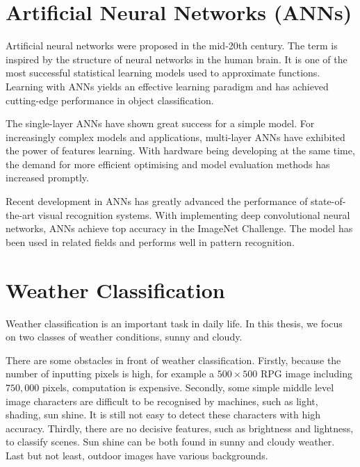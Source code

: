 \section{Artificial Neural Networks (ANNs)}

Artificial neural networks were proposed in the mid-20th century. The term is inspired by the structure of neural networks in the human brain. It is one of the most successful statistical learning models used to approximate functions. Learning with ANNs yields an effective learning paradigm and has achieved cutting-edge performance in object classification. 

The single-layer ANNs  have shown great success for a simple model. For increasingly complex models and applications, multi-layer ANNs have exhibited the power of features learning. With hardware being developing at the same time, the demand for more efficient optimising and model evaluation methods has increased promptly. 

Recent development in ANNs has greatly advanced the performance of state-of-the-art visual recognition systems. With implementing deep convolutional neural networks, ANNs achieve top accuracy in the ImageNet Challenge. The model has been used in related fields and performs well in pattern recognition.

\section{Weather Classification}

Weather classification is an important task in daily life. In this thesis, we focus on two classes of weather conditions, sunny and cloudy. 

There are some obstacles in front of weather classification. Firstly, because the number of inputting pixels is high, for example a $500 \times 500$ RPG image including $750,000$ pixels, computation is expensive. Secondly, some simple middle level image characters are difficult to be recognised by machines, such as light, shading, sun shine. It is still not easy to detect these characters with high accuracy. Thirdly, there are no decisive features, such as brightness and lightness, to classify scenes. Sun shine can be both found in sunny and cloudy weather. Last but not least, outdoor images have various backgrounds.


